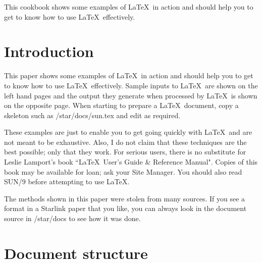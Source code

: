 \documentclass[11pt,twoside]{article}
\newcommand{\stardocinitials}  {SC}
\newcommand{\stardocnumber}    {9.1}
\newcommand{\stardocabstract}  {This cookbook shows some examples of 
\LaTeX\ in action and should help you to
get to know how to use \LaTeX\ effectively.}
\newcommand{\stardocname}{\stardocinitials /\stardocnumber}
\newenvironment{latexonly}{}{}
\newcommand{\xref}[3]{#1}
\newcommand{\xlabel}[1]{}
\newcommand{\latexonlytoc}[0]{\tableofcontents}
\renewcommand{\thepage}{\roman{page}}
\begin{document}
\stardocabstract
 \newpage
 \begin{latexonly}
   \setlength{\parskip}{0mm}
   \latexonlytoc
   \setlength{\parskip}{\medskipamount}
   \markboth{\stardocname}{\stardocname}
 \end{latexonly}
\cleardoublepage
\renewcommand{\thepage}{\arabic{page}}
\setcounter{page}{1}

\section{Introduction\xlabel{introduction}}

This paper shows some examples of \LaTeX\ in action and should help you to
get to know how to use \LaTeX\ effectively.
Sample inputs to \LaTeX\ are shown on the left hand pages and the output they
generate when processed by \LaTeX\ is shown on the opposite page.
When starting to prepare a \LaTeX\ document, copy a skeleton such as
/star/docs/sun.tex and edit as required.

These examples are just to enable you to get going quickly with \LaTeX\
and are not meant to be exhaustive.
Also, I do not claim that these techniques are the best possible; only that
they work.
For serious users, there is no substitute for Leslie Lamport's book
``\LaTeX\ User's Guide \& Reference Manual".
Copies of this book may be available for loan; ask your Site Manager.
You should also read \xref{SUN/9}{sun9}{} before attempting to use \LaTeX.

The methods shown in this paper were stolen from many sources.
If you see a format in a Starlink paper that you like, you can always look
in the document source in /star/docs to see how it was done.

\newpage

\section {Document structure\xlabel{document_structure}}
\end{document}
